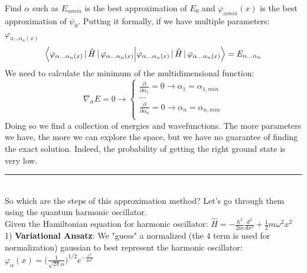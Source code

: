 Find $\alpha$ such as $E_{\alpha min}$ is the best approximation of $E_0$ and $\varphi_{\alpha min}(x)$ is the best approximation of $\psi_0$.
Putting it formally, if we have multiple parameters: $\varphi_{\alpha \dots \alpha_n(x)}$
\[
\braket{\varphi_{\alpha \dots \alpha_n(x)}\,|\,\hat{H}\,|\,\varphi_{\alpha \dots \alpha_n(x)}} = E_{\alpha \dots \alpha_n}
\]
We need to calculate the minimum of the multidimensional function:
\[
\nabla_{\alpha}E=0 \rightarrow
\begin{cases}
\frac{\partial}{\partial \alpha_1}=0 \rightarrow \alpha_1=\alpha_{1, min}\\
\dots\\
\frac{\partial}{\partial \alpha_n}=0 \rightarrow \alpha_n= \alpha_{n, min}\\
\end{cases}
\]
Doing so we find a collection of energies and wavefunctions.
The more parameters we have, the more we can explore the space, but  we have no guarantee of finding the exact solution.
Indeed, the probability of getting the right ground state is very low.
\newline
\noindent\rule{4cm}{0.1pt}
\newline
\\
So which are the steps of this approximation method? Let's go through them using the quantum harmonic oscillator.\\

Given the Hamiltonian equation for harmonic oscillator: $\hat{H}=-\frac{\hbar^2}{2m}\frac{d^2}{dx^2}+\frac{1}{2}m\omega^2x^2$\\
1) \textbf{Variational Ansatz}: We "guess" a normalized (the $4$ term is used for normalization) gaussian to best represent the harmonic oscillator: $\varphi_{\alpha}(x)=\bigg(\frac{1}{\sqrt{2\pi}\alpha}\bigg)^{1/2}e^{-{\frac{x^2}{4\alpha^2}}}$\\

